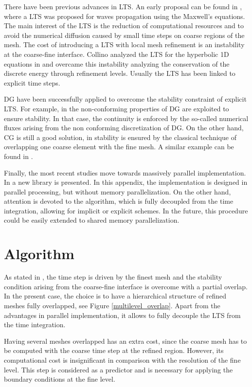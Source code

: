 There have been previous advances in LTS. An early proposal can be found in \cite{chevalier1997}, where a LTS was proposed for waves propagation using the Maxwell's equations. The main interest of the LTS is the reduction of computational resources and to avoid the numerical diffusion caused by small time steps on coarse regions of the mesh. The cost of introducing a LTS with local mesh refinement is an instability at the coarse-fine interface. Collino analyzed the LTS for the hyperbolic 1D equations in \cite{collino2003a,collino2003b} and overcame this instability analyzing the conservation of the discrete energy through refinement levels. Usually the LTS has been linked to explicit time steps.

DG have been successfully applied to overcome the stability constraint of explicit LTS. For example, in \cite{diaz2009} the non-conforming properties of DG are exploited to ensure stability. In that case, the continuity is enforced by the so-called numerical fluxes arising from the non conforming discretization of DG. On the other hand, CG is still a good solution, in \cite{almquist2016} stability is ensured by the classical technique of overlapping one coarse element with the fine mesh. A similar example can be found in \cite{grote2021}.

Finally, the most recent studies move towards massively parallel implementation. In \cite{baiges2016} a new library is presented. In this appendix, the implementation is designed in parallel processing, but without memory parallelization. On the other hand, attention is devoted to the algorithm, which is fully decoupled from the time integration, allowing for implicit or explicit schemes. In the future, this procedure could be easily extended to shared memory parallelization.


\section{Algorithm}

As stated in \cite{almquist2016,collino2003a}, the time step is driven by the finest mesh and the stability condition arising from the coarse-fine interface is overcome with a partial overlap. In the present case, the choice is to have a hierarchical structure of refined meshes fully overlapped, see Figure \ref{multilevel_overlap}. Apart from the advantages in parallel implementation, it allows to fully decouple the LTS from the time integration.

Having several meshes overlapped has an extra cost, since the coarse mesh has to be computed with the coarse time step at the refined region. However, its computational cost is insignificant in comparison with the resolution of the fine level. This step is considered as a predictor and is necessary for applying the boundary conditions at the fine level.

